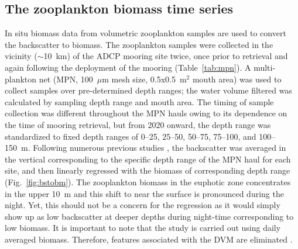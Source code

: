 \documentclass[authoryear,review,11pt]{elsarticle}
\begin{document}

\subsection{The zooplankton biomass time series}
\label{sec:data.biomass}

In situ biomass data from volumetric zooplankton samples are used to convert the backscatter to biomass.  The zooplankton  samples were collected in the vicinity ($\sim$10~km) of the ADCP mooring site twice, once prior to retrieval and again following the deployment of the mooring (Table~\ref{tab:mpn}). A multi-plankton net (MPN, 100~$\mu$m mesh size, 0.5x0.5~m$^2$ mouth area) was used to collect samples over pre-determined depth ranges; the water volume filtered was calculated by sampling depth range and mouth area.  The timing of sample collection was different throughout the MPN hauls owing to its dependence on the time of mooring retrieval, but from 2020 onward, the depth range was standardized to fixed depth ranges of 0--25, 25--50, 50--75, 75--100, and 100--150~m. Following numerous previous studies \citep[A22;][]{flagg1989use, heywood1991estimation, jiang2007temporal}, the backscatter was averaged in the vertical corresponding to the specific depth range of the MPN haul for each site, and then linearly regressed with the biomass of corresponding depth range (Fig.~\ref{fig:bstobm}). The zooplankton biomass in the euphotic zone concentrates in the upper 10~m and this shift to near the surface is pronounced during the night. Yet, this should not be a concern for the regression as it would simply show up as low backscatter at deeper depths during night-time corresponding to low biomass. It is important to note that the study is carried out using daily averaged biomass. Therefore, features associated with the DVM are eliminated \citep[A22;][]{jiang2007temporal}.
\end{document}
